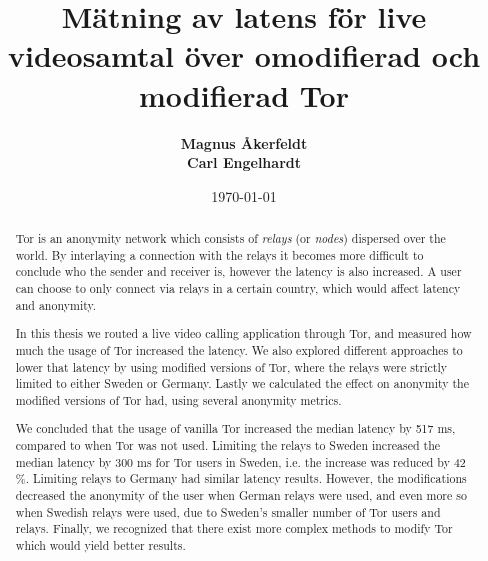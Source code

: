 \documentclass{kththesis}
\title{Mätning av latens för live videosamtal över omodifierad och modifierad Tor}
\author{
  \textbf{Magnus Åkerfeldt}\\
  \textbf{Carl Engelhardt}
}
\date{\today}
\begin{document}
\frontmatter
\titlepage
\begin{abstract}
    Tor is an anonymity network which consists of \emph{relays} (or \emph{nodes}) dispersed over the world. By interlaying a connection with the relays it becomes more difficult to conclude who the sender and receiver is, however the latency is also increased. A user can choose to only connect via relays in a certain country, which would affect latency and anonymity.
    
    In this thesis we routed a live video calling application through Tor, and measured how much the usage of Tor increased the latency. We also explored different approaches to lower that latency by using modified versions of Tor, where the relays were strictly limited to either Sweden or Germany. Lastly we calculated the effect on anonymity the modified versions of Tor had, using several anonymity metrics.
    
    We concluded that the usage of vanilla Tor increased the median latency by 517 ms, compared to when Tor was not used. Limiting the relays to Sweden increased the median latency by 300 ms for Tor users in Sweden, i.e. the increase was reduced by 42 \%. Limiting relays to Germany had similar latency results. However, the modifications decreased the anonymity of the user when German relays were used, and even more so when Swedish relays were used, due to Sweden's smaller number of Tor users and relays. Finally, we recognized that there exist more complex methods to modify Tor which would yield better results.
\end{abstract}
\end{document}
